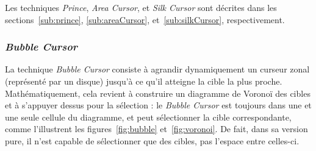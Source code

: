 	Les techniques \emph{Prince}, \emph{Area Cursor}, et \emph{Silk Cursor} sont décrites dans les sections~\ref{sub:prince}, \ref{sub:areaCursor}, et~\ref{sub:silkCursor}, respectivement.

	\subsubsection{\emph{Bubble Cursor}}
	La technique \emph{Bubble Cursor} consiste à agrandir dynamiquement un curseur zonal (représenté par un disque) jusqu'à ce qu'il atteigne la cible la plus proche. Mathématiquement, cela revient à construire un diagramme de Voronoï des cibles et à s'appuyer dessus pour la sélection : le \emph{Bubble Cursor} est toujours dans une et une seule cellule du diagramme, et peut sélectionner la cible correspondante, comme l'illustrent les figures~\ref{fig:bubble} et~\ref{fig:voronoi}. De fait, dans sa version pure, il n'est capable de sélectionner que des cibles, pas l'espace entre celles-ci.	

